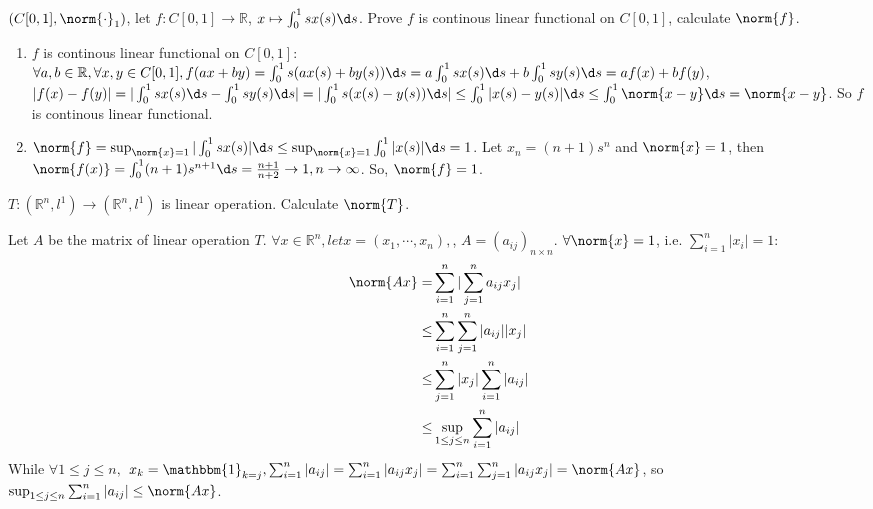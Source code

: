 \documentclass{ctexart}
\newif\ifpreface
\begin{document}
\large
\setlength{\baselineskip}{1.2em}
\ifpreface
    
\else
\maketitle
\fi
{}
\begin{problem}
    $(C[0,1],\norm{\cdot}_1)$, let $f:C[0,1]\to \mathbb{R}$, $x\mapsto\int_0^1sx(s)\d s$. 
    Prove $f$ is continous linear functional on $C[0,1]$, calculate $\norm{f}$.
     
\end{problem}
\begin{solution}
  \begin{enumerate}
    \item \(f\) is continous linear functional on \(C[0,1]\):
      \(\forall a,b \in \mathbb{R}, \forall x,y \in C[0,1], f(ax+by)=\int_{0}^{1} s(ax(s)+by(s)) \d s=a\int_{0}^{1} sx(s)\d s+b\int_{0}^{1}  sy(s)\d s=af(x)+bf(y)\), 
      \(|f(x)-f(y)| = |\int_{0}^{1} sx(s) \d s- \int_{0}^{1} sy(s)\d s|= |\int_{0}^{1} s(x(s)-y(s)) \d s|\leq \int_{0}^{1} |x(s)-y(s)|\d s \leq \int_{0}^{1} \norm{x-y} \d s=\norm{x-y}\). 
      So \(f\) is continous linear functional.
    \item \(\norm{f}=\sup_{\norm{x}=1} |\int_{0}^{1} sx(s)|\d s \leq \sup_{\norm{x} = 1 } \int_{0}^{1} |x(s)| \d s = 1\).
      Let \(x_n=(n+1)s^n\) and \(\norm{x}=1\), then \(\norm{f(x)}=\int_{0}^{1} (n+1)s^{n+1} \d s = \frac{n+1}{n+2} \to 1, n \to \infty\).
      So, \(\norm{f}=1\).
  \end{enumerate}
\end{solution}

\begin{problem}
    $T:(\mathbb{R}^n,l^1)\to (\mathbb{R}^n,l^1)$ is linear operation. Calculate $\norm{T}$.
\end{problem}
\begin{solution}
  Let \(A\) be the matrix of linear operation \(T\). \(\forall x \in \mathbb{R}^{n} , let x = (x_1,\cdots,x_n), \), \(A=(a_{ij})_{n \times n}\). 
  \(\forall \norm{x}=1\), i.e. \(\sum_{i=1}^{n} |x_i|=1\):
  \begin{equation}
    \begin{aligned}
      \, \norm{Ax}=&\sum_{i=1}^{n} |\sum_{j=1}^{n} a_{ij}x_j|\\
    \,\,\,\  \leq&\sum_{i=1}^{n} \sum_{j=1}^{n} |a_{ij}||x_j|\\
    \, \leq&\sum_{j=1}^{n} |x_j|\sum_{i=1}^{n} |a_{ij}|\\
    \leq&\sup_{1 \leq j \leq n} \sum_{i=1}^{n} |a_{ij}|\\
    \end{aligned}
  \end{equation}
While \(\forall 1 \leq j \leq n,\) \(x_k=\mathbbm{1}_{k=j}, \sum_{i=1}^{n} |a_{ij}|=\sum_{i=1}^{n} |a_{ij}x_j|
=\sum_{i=1}^{n} \sum_{j=1}^{n} |a_{ij}x_j|=\norm{Ax}\), 
so \(\sup_{1 \leq j \leq n} \sum_{i=1}^{n} |a_{ij}|\leq \norm{Ax}\).
  
\end{solution}
\end{document}
